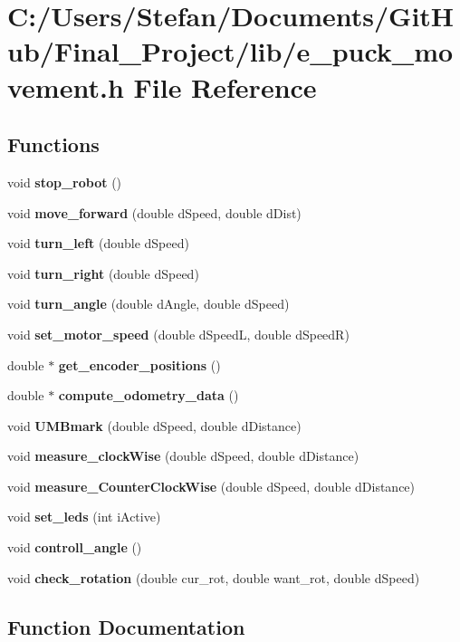 \section{C\-:/\-Users/\-Stefan/\-Documents/\-Git\-Hub/\-Final\-\_\-\-Project/lib/e\-\_\-puck\-\_\-movement.h File Reference}
\label{e__puck__movement_8h}
\subsection*{Functions}
\begin{DoxyCompactItemize}
\item 
void {\bf stop\-\_\-robot} ()
\item 
void {\bf move\-\_\-forward} (double d\-Speed, double d\-Dist)
\item 
void {\bf turn\-\_\-left} (double d\-Speed)
\item 
void {\bf turn\-\_\-right} (double d\-Speed)
\item 
void {\bf turn\-\_\-angle} (double d\-Angle, double d\-Speed)
\item 
void {\bf set\-\_\-motor\-\_\-speed} (double d\-Speed\-L, double d\-Speed\-R)
\item 
double $\ast$ {\bf get\-\_\-encoder\-\_\-positions} ()
\item 
double $\ast$ {\bf compute\-\_\-odometry\-\_\-data} ()
\item 
void {\bf U\-M\-Bmark} (double d\-Speed, double d\-Distance)
\item 
void {\bf measure\-\_\-clock\-Wise} (double d\-Speed, double d\-Distance)
\item 
void {\bf measure\-\_\-\-Counter\-Clock\-Wise} (double d\-Speed, double d\-Distance)
\item 
void {\bf set\-\_\-leds} (int i\-Active)
\item 
void {\bf controll\-\_\-angle} ()
\item 
void {\bf check\-\_\-rotation} (double cur\-\_\-rot, double want\-\_\-rot, double d\-Speed)
\end{DoxyCompactItemize}


\subsection{Function Documentation}
